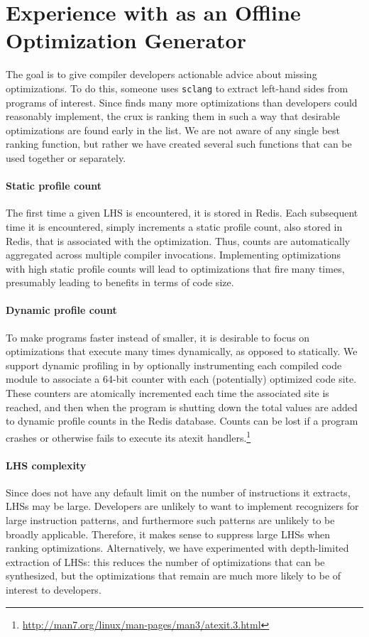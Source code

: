 \section{Experience with \tool{} as an Offline Optimization Generator}
\label{sec:offline}

The goal is to give compiler developers actionable advice about
missing optimizations.
%
To do this, someone uses \texttt{sclang} to extract \tool{} left-hand
sides from programs of interest.
%
Since \tool{} finds many more optimizations than developers could
reasonably implement, the crux is ranking them in such a way that
desirable optimizations are found early in the list.
%
We are not aware of any single best ranking function, but rather we
have created several such functions that can be used together or
separately.


\paragraph{Static profile count}
%
The first time a given LHS is encountered, it is stored in Redis.
%
Each subsequent time it is encountered, \tool{} simply increments a
static profile count, also stored in Redis, that is associated with
the optimization.
%
Thus, counts are automatically aggregated across multiple compiler
invocations.
%
Implementing optimizations with high static profile counts will lead
to optimizations that fire many times, presumably leading to benefits
in terms of code size.

\paragraph{Dynamic profile count}
%
To make programs faster instead of smaller, it is desirable to focus
on optimizations that execute many times dynamically, as opposed to
statically.
%
We support dynamic profiling in \tool{} by optionally instrumenting
each compiled code module to associate a 64-bit counter with each
(potentially) optimized code site.
%
These counters are atomically incremented each time the associated
site is reached, and then when the program is shutting down the total
values are added to dynamic profile counts in the Redis database.
%
Counts can be lost if a program crashes or
otherwise fails to execute its atexit
handlers.\footnote{\url{http://man7.org/linux/man-pages/man3/atexit.3.html}}


\paragraph{LHS complexity}
%
Since \tool{} does not have any default limit on the number of
instructions it extracts, LHSs may be large.
%
Developers are unlikely to want to implement recognizers for large
instruction patterns, and furthermore such patterns are unlikely to be
broadly applicable.
%
Therefore, it makes sense to suppress large LHSs when ranking
optimizations.
%
Alternatively, we have experimented with depth-limited extraction of
LHSs: this reduces the number of optimizations that can be
synthesized, but the optimizations that remain are much more likely to
be of interest to developers.


